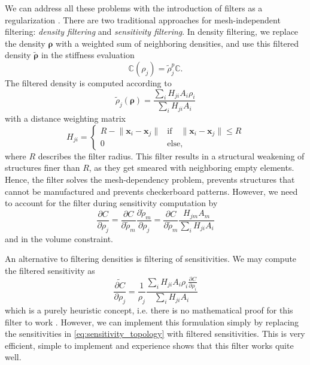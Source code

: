We can address all these problems with the introduction of filters as a regularization \cite{Harzheim2014, Lazarov2011}. There are two traditional approaches for mesh-independent filtering: \emph{density filtering} and \emph{sensitivity filtering}. In density filtering, we replace the density $\pmb{\rho}$ with a weighted sum of neighboring densities, and use this filtered density $\tilde{\pmb{\rho}}$ in the stiffness evaluation
\begin{equation}
    \mathbb{C}(\rho_j)= \tilde{\rho}_j^p \mathbb{C}.
\end{equation}
The filtered density is computed according to 
\begin{equation}
    \tilde{\rho}_j (\pmb{\rho}) = \frac{\sum_i H_{ji} A_i \rho_i}{\sum_i H_{ji} A_i}
\end{equation}
with a distance weighting matrix
\begin{equation}
    H_{ji} = 
    \begin{cases}
        R-\lVert \mathbf{x}_i - \mathbf{x}_j\rVert & \text{if} \quad \lVert \mathbf{x}_i - \mathbf{x}_j\rVert \le R \\
        0 & \text{else},
    \end{cases}
\end{equation}
where $R$ describes the filter radius. This filter results in a structural weakening of structures finer than $R$, as they get smeared with neighboring empty elements. Hence, the filter solves the mesh-dependency problem, prevents structures that cannot be manufactured and prevents checkerboard patterns. However, we need to account for the filter during sensitivity computation by 
\begin{equation}
    \frac{\partial C}{\partial \rho_j} 
    = \frac{\partial C}{\partial \tilde{\rho}_m} \frac{\partial \tilde{\rho}_m}{\partial \rho_j}
    = \frac{\partial C}{\partial \tilde{\rho}_m}  \frac{H_{jm} A_m }{\sum_i H_{ji} A_i}
\end{equation}
and in the volume constraint.

An alternative to filtering densities is filtering of sensitivities. We may compute the filtered sensitivity as
\begin{equation}
    \widetilde{\frac{\partial C}{\partial \rho_j}} = \frac{1}{\rho_j} \frac{\sum_i H_{ji} A_i \rho_i \frac{\partial C}{\partial \rho_i} }{\sum_i H_{ji} A_i}
\end{equation}
which is a purely heuristic concept, i.e. there is no mathematical proof for this filter to work \cite{Sigmund1998}. However, we can implement this formulation simply by replacing the sensitivities in \eqref{eq:sensitivity_topology} with filtered sensitivities. This is very efficient, simple to implement and experience shows that this filter works quite well.

